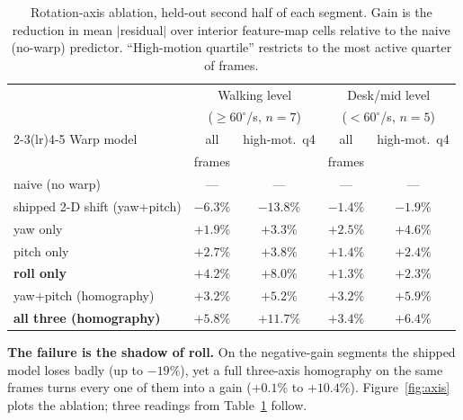 \documentclass[12pt,a4paper]{article}
\begin{document}
\begin{table}[htbp]
  \centering
  \small
  \caption{Rotation-axis ablation, held-out second half of each segment. Gain is the reduction in mean $|$residual$|$ over interior feature-map cells relative to the naive (no-warp) predictor. ``High-motion quartile'' restricts to the most active quarter of frames.}
  \label{tab:axis}
  \begin{tabular}{lcccc}
    \toprule
    & \multicolumn{2}{c}{Walking level} & \multicolumn{2}{c}{Desk/mid level} \\
    & \multicolumn{2}{c}{($\ge 60^\circ$/s, $n{=}7$)} & \multicolumn{2}{c}{($<60^\circ$/s, $n{=}5$)} \\
    \cmidrule(lr){2-3}\cmidrule(lr){4-5}
    Warp model & all & high-mot.\ q4 & all & high-mot.\ q4 \\
               & frames & & frames & \\
    \midrule
    naive (no warp) & --- & --- & --- & --- \\
    shipped 2-D shift (yaw$+$pitch) & $-6.3\%$ & $-13.8\%$ & $-1.4\%$ & $-1.9\%$ \\
    yaw only & $+1.9\%$ & $+3.3\%$ & $+2.5\%$ & $+4.6\%$ \\
    pitch only & $+2.7\%$ & $+3.8\%$ & $+1.4\%$ & $+2.4\%$ \\
    \textbf{roll only} & $\mathbf{+4.2\%}$ & $\mathbf{+8.0\%}$ & $+1.3\%$ & $+2.3\%$ \\
    yaw$+$pitch (homography) & $+3.2\%$ & $+5.2\%$ & $+3.2\%$ & $+5.9\%$ \\
    \textbf{all three (homography)} & $\mathbf{+5.8\%}$ & $\mathbf{+11.7\%}$ & $+3.4\%$ & $+6.4\%$ \\
    \bottomrule
  \end{tabular}
\end{table}

\textbf{The failure is the shadow of roll.} On the negative-gain segments the shipped model loses badly (up to $-19\%$), yet a full three-axis homography on the same frames turns every one of them into a gain ($+0.1\%$ to $+10.4\%$). Figure~\ref{fig:axis} plots the ablation; three readings from Table~\ref{tab:axis} follow.
\end{document}

